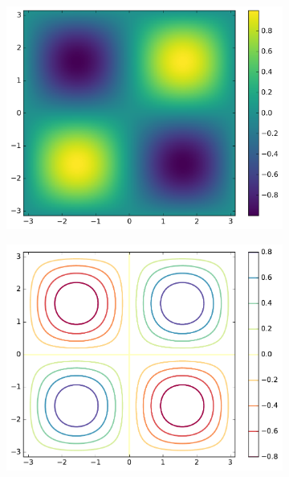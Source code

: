 \begin{figure}[H] %
\captionsetup[subfigure]{justification=centering}
\centering
\begin{subfigure}{.33\textwidth}
    \centering
    \includegraphics[width=\linewidth]{figures/heatmap.png}
\end{subfigure}%
\begin{subfigure}{.33\textwidth}
    \centering
    \includegraphics[width=\linewidth]{figures/contour.pdf}
\end{subfigure}%
\begin{subfigure}{.33\textwidth}

\end{subfigure}
\end{figure}
